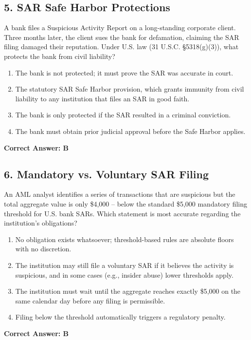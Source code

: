 \documentclass[11pt,a4paper]{article}
\begin{document}
	\subsection{5. SAR Safe Harbor Protections}
	A bank files a Suspicious Activity Report on a long-standing corporate client. Three months later, the client sues the bank for defamation, claiming the SAR filing damaged their reputation. Under U.S. law (31 U.S.C. \S 5318(g)(3)), what protects the bank from civil liability?
	\begin{enumerate}[label=\Alph*.]
		\item The bank is not protected; it must prove the SAR was accurate in court.
		\item The statutory SAR Safe Harbor provision, which grants immunity from civil liability to any institution that files an SAR in good faith.
		\item The bank is only protected if the SAR resulted in a criminal conviction.
		\item The bank must obtain prior judicial approval before the Safe Harbor applies.
	\end{enumerate}
	\textbf{Correct Answer: B}
	
	\subsection{6. Mandatory vs. Voluntary SAR Filing}
	An AML analyst identifies a series of transactions that are suspicious but the total aggregate value is only \$4,000 -- below the standard \$5,000 mandatory filing threshold for U.S. bank SARs. Which statement is most accurate regarding the institution's obligations?
	\begin{enumerate}[label=\Alph*.]
		\item No obligation exists whatsoever; threshold-based rules are absolute floors with no discretion.
		\item The institution may still file a voluntary SAR if it believes the activity is suspicious, and in some cases (e.g., insider abuse) lower thresholds apply.
		\item The institution must wait until the aggregate reaches exactly \$5,000 on the same calendar day before any filing is permissible.
		\item Filing below the threshold automatically triggers a regulatory penalty.
	\end{enumerate}
	\textbf{Correct Answer: B}
	
\end{document}
